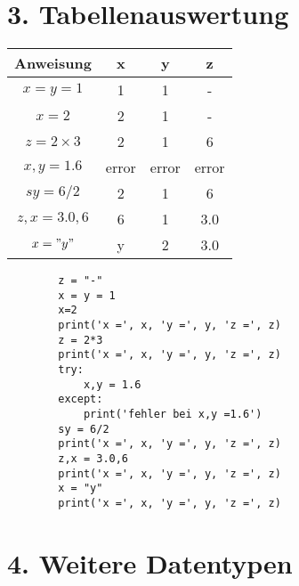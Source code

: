\documentclass{article}
\begin{document}
\section*{3. Tabellenauswertung}
\begin{table}[h]
    \begin{minipage}{0.5\textwidth}
        \centering
        \begin{tabular}{|c|c|c|c|}\hline
            \textbf{Anweisung} & \textbf{x} & \textbf{y} & \textbf{z} \\
            \hline
            $x = y = 1$ & 1 & 1 & -\\
            \hline
            $x = 2$ & 2 & 1 & - \\
            \hline
            $z = 2 \times 3$ & 2 & 1 & 6\\
            \hline
            $x, y = 1.6$ & error & error & error\\
            \hline
            $sy = 6/2$& 2 & 1 & 6 \\
            \hline
            $z,x = 3.0,6$& 6& 1 & 3.0 \\
            \hline
            $x = "y"$& y & 2 & 3.0 \\
            \hline
        \end{tabular}
    \end{minipage}
    \begin{minipage}{0.5\textwidth}
        \begin{mdframed}[linewidth=1pt, 
            linecolor=black, 
            innerleftmargin=-20pt, 
            innerrightmargin=30pt, 
            innertopmargin=20pt, 
            innerbottommargin=20pt, 
            userdefinedwidth=\textwidth, 
            align=center]
        \begin{verbatim}
        z = "-"
        x = y = 1
        x=2
        print('x =', x, 'y =', y, 'z =', z)
        z = 2*3
        print('x =', x, 'y =', y, 'z =', z)
        try:
            x,y = 1.6
        except:
            print('fehler bei x,y =1.6')
        sy = 6/2
        print('x =', x, 'y =', y, 'z =', z)
        z,x = 3.0,6
        print('x =', x, 'y =', y, 'z =', z)
        x = "y"
        print('x =', x, 'y =', y, 'z =', z)
        \end{verbatim}
        \end{mdframed}
    \end{minipage}
\end{table}
\section*{4. Weitere Datentypen}
\end{document}
